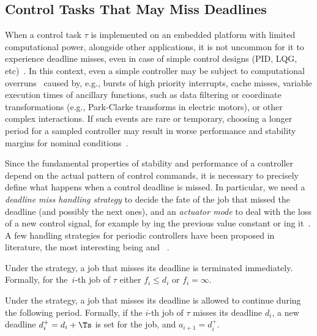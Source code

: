 \subsection{Control Tasks That May Miss Deadlines}
\label{sec:back_deadline_miss}
When a control task $\tau$ is implemented on an embedded platform with limited computational power, alongside other applications, it is not uncommon for it to experience deadline misses, even in case of simple control designs (PID, LQG, etc)~\cite{akesson2020empirical,pazzaglia2021adaptive}.
In this context, even a simple controller may be subject to computational overruns~\cite{akesson2020empirical} caused by, e.g., bursts of high priority interrupts, cache misses, variable execution times of ancillary functions, such as data filtering or coordinate transformations (e.g., Park-Clarke transforms in electric motors), or other complex interactions.
If such events are rare or temporary, choosing a longer period for a sampled controller may result in worse performance and stability margins for nominal conditions~\cite{Pazzaglia:2019}.

Since the fundamental properties of stability and performance of a controller depend on the actual pattern of control commands, it is necessary to precisely define what happens when a control deadline is missed.
In particular, we need a \emph{deadline miss handling strategy} to decide the fate of the job that missed the deadline (and possibly the next ones), and an \emph{actuator mode} to deal with the loss of a new control signal, for example by \tH{}ing the previous value constant or \tZ{}ing it~\cite{schenato09}.
A few handling strategies for periodic controllers have been proposed in literature, the most interesting being \emph{\tK{}} and \emph{\tS{}}~\cite{Cervin:2005,Pazzaglia:2019,Maggio:2020}.

\begin{definition}[\tK{} strategy]%
    \label{def:kill}%
    Under the \tK{} strategy, a job that misses its deadline is terminated immediately. 
    Formally, for the~$i$-th job of $\tau$ either $f_i\leq d_i$ or $f_i=\infty$.
\end{definition}

\begin{definition}[\tS{} strategy]%
    \label{def:skip}%
    Under the \tS{} strategy, a job that misses its deadline is allowed to continue during the following period.
    Formally, if the $i$-th job of $\tau$ misses its deadline $d_i$, a new deadline $d^{+}_i = d_i + \Ts$ is set for the job, and $a_{i+1} = d^{+}_i$.
\end{definition}


